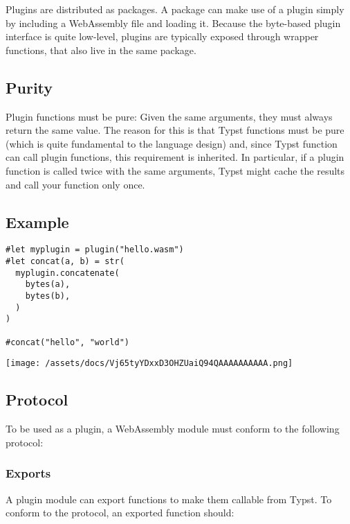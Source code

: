 Plugins are distributed as packages. A package can make use of a plugin
simply by including a WebAssembly file and loading it. Because the
byte-based plugin interface is quite low-level, plugins are typically
exposed through wrapper functions, that also live in the same package.

\subsection{Purity}\label{purity}

Plugin functions must be pure: Given the same arguments, they must
always return the same value. The reason for this is that Typst
functions must be pure (which is quite fundamental to the language
design) and, since Typst function can call plugin functions, this
requirement is inherited. In particular, if a plugin function is called
twice with the same arguments, Typst might cache the results and call
your function only once.

\subsection{Example}\label{example}

\begin{verbatim}
#let myplugin = plugin("hello.wasm")
#let concat(a, b) = str(
  myplugin.concatenate(
    bytes(a),
    bytes(b),
  )
)

#concat("hello", "world")
\end{verbatim}

\texttt{[image: /assets/docs/Vj65tyYDxxD3OHZUaiQ94QAAAAAAAAAA.png]}

\subsection{Protocol}\label{protocol}

To be used as a plugin, a WebAssembly module must conform to the
following protocol:

\subsubsection{Exports}\label{exports}

A plugin module can export functions to make them callable from Typst.
To conform to the protocol, an exported function should:

